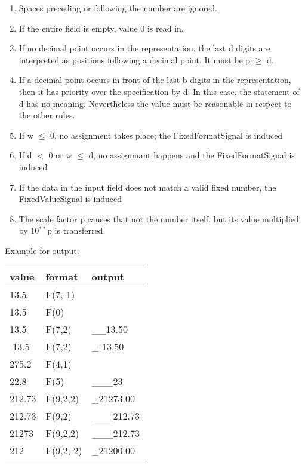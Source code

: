 \begin{added}
\begin{enumerate}
\begin{enumerate}
\item Spaces preceding or following the number are ignored.
\item If the entire field is empty, value 0 is read in.
\item If no decimal point occurs in the representation, the last d
digits are interpreted as positions following a decimal point. It must
be p $\geq$ d.
\item If a decimal point occurs in front of the last b digits in the
representation, then it has priority over the specification by d. In
this case, the statement of d has no meaning. Nevertheless the value must
be reasonable in respect to the other rules. 
\item If w $\leq$ 0, no assignment takes place;
    the FixedFormatSignal is induced
\item If d $<$ 0 or w $\leq$ d, no assignmant happens and 
    the FixedFormatSignal is induced
\item If the data in the input field does not match a valid fixed 
   number, the FixedValueSignal is induced
\item The scale factor p causes that not the number itself, but its
value multiplied by 10$^{**}$p is transferred.
\end{enumerate}
\end{enumerate}

Example for output:

\begin{tabular}{lll}
value  & format   & output \\ \hline
13.5   & F(7,-1)   &  \x \x {\em FixedFormatSignal!}  \\
13.5   & F(0)   &  \x \x {\em FixedFormatSignal!}  \\
13.5   & F(7,2)   & \_\_13.50  \\
-13.5   & F(7,2)   & \_-13.50  \\
275.2  & F(4,1)   &  \x \x {\em FixedValueSignal!} \\
22.8   & F(5)     & \_\_\_23 \\
212.73 & F(9,2,2) & \_21273.00 \\
212.73 & F(9,2)   & \_\_\_212.73 \\
21273 & F(9,2,2)   & \_\_\_212.73 \\
212 & F(9,2,-2)   & \_21200.00 \\
\end{tabular}
\end{added}

